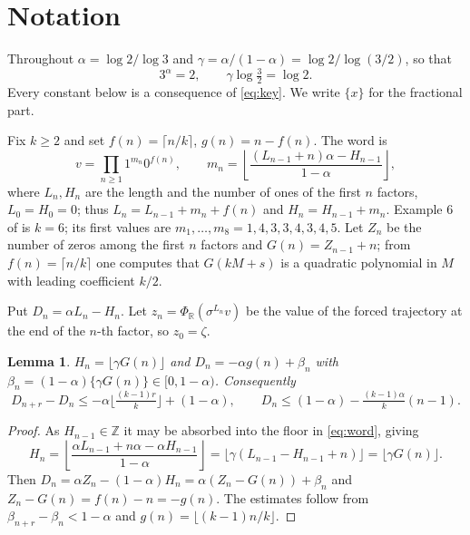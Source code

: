 \documentclass[11pt,a4paper]{article}
\theoremstyle{plain}
\newtheorem{lemma}[theorem]{Lemma}
\theoremstyle{definition}
\newcommand{\R}{\mathbb{R}}
\newcommand{\Z}{\mathbb{Z}}
\newcommand{\al}{\alpha}
\newcommand{\ga}{\gamma}
\newcommand{\fr}[1]{\{#1\}}
\begin{document}
\section{Notation}\label{sec:setup}

Throughout $\al=\log2/\log3$ and $\ga=\al/(1-\al)=\log2/\log(3/2)$, so that
\begin{equation}\label{eq:key}
  3^{\al}=2,\qquad \ga\log\tfrac32=\log2 .
\end{equation}
Every constant below is a consequence of \eqref{eq:key}. We write $\fr{x}$ for the fractional part.

Fix $k\ge2$ and set $f(n)=\lceil n/k\rceil$, $g(n)=n-f(n)$. The word is
\begin{equation}\label{eq:word}
  v=\prod_{n\ge1}1^{m_n}0^{f(n)},\qquad
  m_n=\left\lfloor\frac{(L_{n-1}+n)\al-H_{n-1}}{1-\al}\right\rfloor ,
\end{equation}
where $L_n,H_n$ are the length and the number of ones of the first $n$ factors, $L_0=H_0=0$; thus
$L_n=L_{n-1}+m_n+f(n)$ and $H_n=H_{n-1}+m_n$. Example 6 of \cite{LS} is $k=6$; its first values are
$m_1,\dots,m_8=1,4,3,3,4,3,4,5$. Let $Z_n$ be the number of zeros among the first $n$ factors and
$G(n)=Z_{n-1}+n$; from $f(n)=\lceil n/k\rceil$ one computes that $G(kM+s)$ is a quadratic polynomial
in $M$ with leading coefficient $k/2$.

Put $D_n=\al L_n-H_n$. Let $z_n=\Phi_\R(\sigma^{L_n}v)$ be the value of the forced trajectory at the
end of the $n$-th factor, so $z_0=\zeta$.

\begin{lemma}\label{lem:drift}
$H_n=\lfloor\ga G(n)\rfloor$ and $D_n=-\al g(n)+\beta_n$ with $\beta_n=(1-\al)\fr{\ga G(n)}\in[0,1-\al)$.
Consequently
\begin{equation}\label{eq:ramp}
   D_{n+r}-D_n\le-\al\Big\lfloor\tfrac{(k-1)r}{k}\Big\rfloor+(1-\al),
   \qquad
   D_n\le(1-\al)-\tfrac{(k-1)\al}{k}(n-1).
\end{equation}
\end{lemma}

\begin{proof}
As $H_{n-1}\in\Z$ it may be absorbed into the floor in \eqref{eq:word}, giving
\[
  H_n=\left\lfloor\frac{\al L_{n-1}+n\al-\al H_{n-1}}{1-\al}\right\rfloor
     =\big\lfloor\ga(L_{n-1}-H_{n-1}+n)\big\rfloor=\lfloor\ga G(n)\rfloor .
\]
Then $D_n=\al Z_n-(1-\al)H_n=\al(Z_n-G(n))+\beta_n$ and $Z_n-G(n)=f(n)-n=-g(n)$. The estimates
follow from $\beta_{n+r}-\beta_n<1-\al$ and $g(n)=\lfloor(k-1)n/k\rfloor$.
\end{proof}
\end{document}
